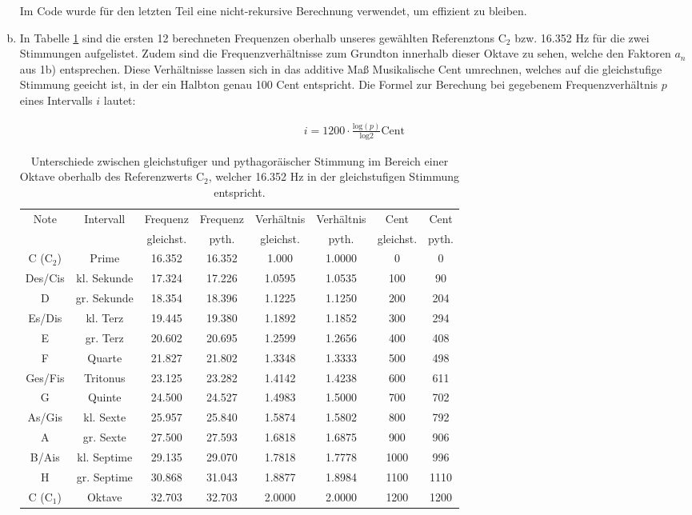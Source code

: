 \begin{enumerate}[a)]
Im Code wurde für den letzten Teil eine nicht-rekursive Berechnung verwendet, um effizient zu bleiben.

\item

In Tabelle \ref{tab:t1} sind die ersten 12 berechneten Frequenzen oberhalb unseres gewählten Referenztons C$_{2}$ bzw. 16.352 Hz für die zwei Stimmungen aufgelistet. Zudem sind die Frequenzverhältnisse zum Grundton innerhalb dieser Oktave zu sehen, welche den Faktoren $a_n$ aus 1b) entsprechen. Diese Verhältnisse lassen sich in das additive Maß \glqq Musikalische Cent \grqq umrechnen, welches auf die gleichstufige Stimmung geeicht ist, in der ein Halbton genau 100 Cent entspricht. Die Formel zur Berechung bei gegebenem Frequenzverhältnis $p$ eines Intervalls $i$ lautet:

\begin{align*}
    i = 1200 \cdot \frac{\mathrm{log}(p)}{\mathrm{log} 2} \mathrm{Cent}
\end{align*}




\begin{table}
\centering
\begin{tabular}{| c | c | c | c | c | c | c | c |}
  \hline			
  Note & Intervall& Frequenz & Frequenz & Verhältnis & Verhältnis & Cent& Cent \\
  & &gleichst. & pyth. & gleichst. & pyth. & gleichst. & pyth. \\
  \hline
  C (C$_{2}$) & Prime&16.352 & 16.352 & 1.000 & 1.0000 & 0 & 0 \\
  Des/Cis & kl. Sekunde& 17.324 & 17.226 & 1.0595 & 1.0535 & 100 & 90\\
  D &gr. Sekunde &18.354 & 18.396 & 1.1225 & 1.1250 & 200 & 204\\
  Es/Dis & kl. Terz & 19.445 & 19.380 & 1.1892 & 1.1852 & 300 & 294 \\
  E & gr. Terz &20.602 & 20.695 & 1.2599 & 1.2656 & 400 & 408\\
  F & Quarte &21.827 & 21.802 & 1.3348 & 1.3333 & 500 & 498\\
  Ges/Fis & Tritonus&23.125 & 23.282 & 1.4142 & 1.4238 & 600 & 611 \\
  G & Quinte & 24.500 & 24.527 & 1.4983 & 1.5000 & 700 &  702 \\
  As/Gis & kl. Sexte& 25.957 & 25.840 & 1.5874 & 1.5802 & 800 & 792\\
  A & gr. Sexte&27.500 & 27.593 & 1.6818 & 1.6875 &  900 & 906\\
  B/Ais & kl. Septime& 29.135 & 29.070 & 1.7818 & 1.7778 & 1000 & 996 \\
  H & gr. Septime&30.868 & 31.043 & 1.8877 & 1.8984 & 1100 & 1110\\
  C (C$_{1}$)& Oktave & 32.703 & 32.703 &2.0000 &2.0000 & 1200 & 1200\\
  \hline  
\end{tabular}
\caption{Unterschiede zwischen gleichstufiger und pythagoräischer Stimmung im Bereich einer Oktave oberhalb des Referenzwerts C$_{2}$, welcher 16.352 Hz in der gleichstufigen Stimmung entspricht.}
\label{tab:t1}
\end{table}



\end{enumerate}
